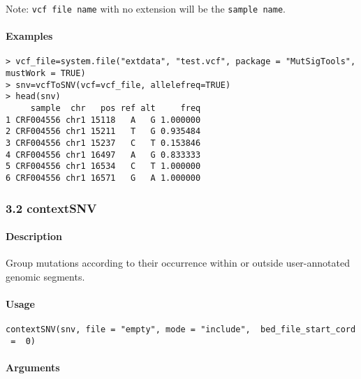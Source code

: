 \documentclass[]{article}
\let\oldparagraph\paragraph
\renewcommand{\paragraph}[1]{\oldparagraph{#1}\mbox{}}
\begin{document}
Note: \texttt{vcf\ file\ name} with no extension will be the
\texttt{sample\ name}.

\paragraph{\texorpdfstring{\textbf{Examples}}{Examples}}\label{examples}

\begin{verbatim}
> vcf_file=system.file("extdata", "test.vcf", package = "MutSigTools", mustWork = TRUE) 
> snv=vcfToSNV(vcf=vcf_file, allelefreq=TRUE)
> head(snv)
     sample  chr   pos ref alt     freq
1 CRF004556 chr1 15118   A   G 1.000000
2 CRF004556 chr1 15211   T   G 0.935484
3 CRF004556 chr1 15237   C   T 0.153846
4 CRF004556 chr1 16497   A   G 0.833333
5 CRF004556 chr1 16534   C   T 1.000000
6 CRF004556 chr1 16571   G   A 1.000000
\end{verbatim}

\subsubsection{3.2 contextSNV}\label{contextsnv}

\paragraph{\texorpdfstring{\textbf{Description}}{Description}}\label{description-1}

Group mutations according to their occurrence within or outside
user-annotated genomic segments.

\paragraph{\texorpdfstring{\textbf{Usage}}{Usage}}\label{usage-1}

\texttt{contextSNV(snv,\ file\ =\ "empty",\ mode\ =\ "include", \ bed\_file\_start\_cord \ = \ 0)}

\paragraph{\texorpdfstring{\textbf{Arguments
}}{Arguments }}\label{arguments-1}
\end{document}
